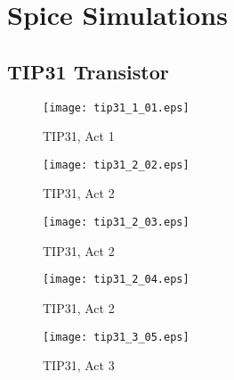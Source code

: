 

\section{Spice Simulations}

\subsection{TIP31 Transistor}
	\begin{figure}[hb!]
		\centering
		\texttt{[image: tip31\_1\_01.eps]}
		\caption{TIP31, Act 1}
		\label{fig:t1}
	\end{figure}

	\begin{framed}
	
	\end{framed}

	\begin{figure}[hb!]
		\centering
		\texttt{[image: tip31\_2\_02.eps]}
		\caption{TIP31, Act 2}
		\label{fig:t2}
	\end{figure}

	\begin{framed}
	
	\end{framed}
	
	\begin{figure}[hb!]
		\centering
		\texttt{[image: tip31\_2\_03.eps]}
		\caption{TIP31, Act 2}
		\label{fig:t3}
	\end{figure}

	\begin{framed}
	
	\end{framed}


	\begin{figure}[hb!]
		\centering
		\texttt{[image: tip31\_2\_04.eps]}
		\caption{TIP31, Act 2}
		\label{fig:t4}
	\end{figure}

	\begin{framed}
	
	\end{framed}

	\begin{figure}[hb!]
		\centering
		\texttt{[image: tip31\_3\_05.eps]}
		\caption{TIP31, Act 3}
		\label{fig:t5}
	\end{figure}

	\begin{framed}
	
	\end{framed}
	
